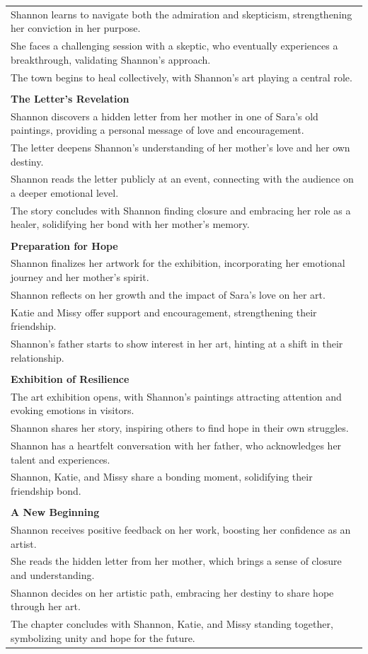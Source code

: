\begin{small}
\begin{longtable}{p{}}
Shannon learns to navigate both the admiration and skepticism, strengthening her conviction in her purpose.\\
She faces a challenging session with a skeptic, who eventually experiences a breakthrough, validating Shannon's approach.\\
The town begins to heal collectively, with Shannon's art playing a central role.\\
\\
\textbf{The Letter's Revelation}\\
Shannon discovers a hidden letter from her mother in one of Sara's old paintings, providing a personal message of love and encouragement.\\
The letter deepens Shannon's understanding of her mother's love and her own destiny.\\
Shannon reads the letter publicly at an event, connecting with the audience on a deeper emotional level.\\
The story concludes with Shannon finding closure and embracing her role as a healer, solidifying her bond with her mother's memory.\\
\\
\textbf{Preparation for Hope}\\
Shannon finalizes her artwork for the exhibition, incorporating her emotional journey and her mother's spirit.\\
Shannon reflects on her growth and the impact of Sara's love on her art.\\
Katie and Missy offer support and encouragement, strengthening their friendship.\\
Shannon's father starts to show interest in her art, hinting at a shift in their relationship.\\
\\
\textbf{Exhibition of Resilience}\\
The art exhibition opens, with Shannon's paintings attracting attention and evoking emotions in visitors.\\
Shannon shares her story, inspiring others to find hope in their own struggles.\\
Shannon has a heartfelt conversation with her father, who acknowledges her talent and experiences.\\
Shannon, Katie, and Missy share a bonding moment, solidifying their friendship bond.\\
\\
\textbf{A New Beginning}\\
Shannon receives positive feedback on her work, boosting her confidence as an artist.\\
She reads the hidden letter from her mother, which brings a sense of closure and understanding.\\
Shannon decides on her artistic path, embracing her destiny to share hope through her art.\\
The chapter concludes with Shannon, Katie, and Missy standing together, symbolizing unity and hope for the future.\\



\end{longtable}
\end{small}
